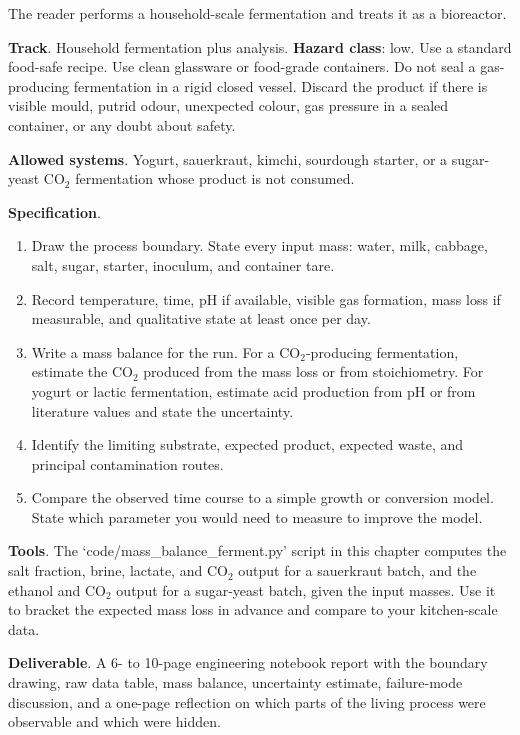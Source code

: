 \begin{project}
The reader performs a household-scale fermentation and treats it as a
bioreactor.

\textbf{Track}. Household fermentation plus analysis.
\textbf{Hazard class}: low. Use a standard food-safe recipe. Use clean
glassware or food-grade containers. Do not seal a gas-producing
fermentation in a rigid closed vessel. Discard the product if there is
visible mould, putrid odour, unexpected colour, gas pressure in a sealed
container, or any doubt about safety.

\textbf{Allowed systems}. Yogurt, sauerkraut, kimchi, sourdough starter,
or a sugar-yeast CO$_2$ fermentation whose product is not consumed.

\textbf{Specification}.

\begin{enumerate}[leftmargin=*]
\item Draw the process boundary. State every input mass: water, milk,
  cabbage, salt, sugar, starter, inoculum, and container tare.
\item Record temperature, time, pH if available, visible gas formation,
  mass loss if measurable, and qualitative state at least once per day.
\item Write a mass balance for the run. For a CO$_2$-producing
  fermentation, estimate the CO$_2$ produced from the mass loss or from
  stoichiometry. For yogurt or lactic fermentation, estimate acid
  production from pH or from literature values and state the uncertainty.
\item Identify the limiting substrate, expected product, expected waste,
  and principal contamination routes.
\item Compare the observed time course to a simple growth or conversion
  model. State which parameter you would need to measure to improve the
  model.
\end{enumerate}

\textbf{Tools}. The `code/mass_balance_ferment.py' script in this
chapter computes the salt fraction, brine, lactate, and CO$_2$ output
for a sauerkraut batch, and the ethanol and CO$_2$ output for a
sugar-yeast batch, given the input masses. Use it to bracket the
expected mass loss in advance and compare to your kitchen-scale data.

\textbf{Deliverable}. A 6- to 10-page engineering notebook report with
the boundary drawing, raw data table, mass balance, uncertainty
estimate, failure-mode discussion, and a one-page reflection on which
parts of the living process were observable and which were hidden.
\end{project}


